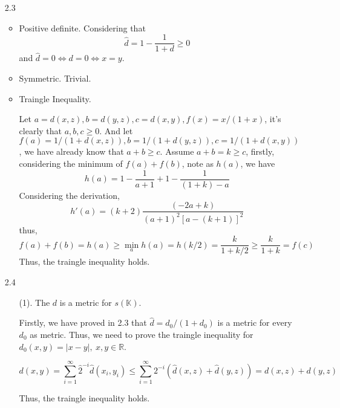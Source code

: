 \documentclass{article}
\begin{document}
\begin{enumerate}
\begin{enumerate}
    \end{enumerate}


\item[2.3]
    \begin{itemize}
        \item Positive definite.
        Considering that
        \[\hat d = 1 - \frac{1}{1 + d} \ge 0\]
        and \(\hat d = 0 \iff d = 0 \iff x = y\).

        \item Symmetric. Trivial.
        \item Traingle Inequality.
        
        Let \(a = d(x, z), b = d(y, z), c = d(x, y), f(x) = x/(1 + x)\), it's clearly that \(a, b, c \ge 0\). And let \(f(a) = 1/(1 + d(x, z)), b = 1/(1 + d(y, z)), c = 1/(1 + d(x, y))\), we have already know that \(a + b \ge c\). Assume \(a + b = k \ge c\), firstly, considering the minimum of \(f(a) + f(b)\), note as \(h(a)\), we have
        \[h(a) = 1 - \frac{1}{a + 1} + 1 - \frac{1}{(1 + k) - a}\]
        Considering the derivation,
        \[h'(a) = (k + 2)\frac{(-2a + k)}{{(a + 1)}^2{[a - (k + 1)]}^2}\]
        thus, 
        \[f(a) + f(b) = h(a) \ge \min_a h(a) = h(k/2) = \frac{k}{1 + k/2} \ge \frac{k}{1 + k} = f(c)\]
        Thus, the traingle inequality holds.
    \end{itemize}


\item[2.4]
    \begin{enumerate}
        \item[(1).] The \(d\) is a metric for \(s(\mathbb K)\).
        
        Firstly, we have proved in 2.3 that \(\hat d = d_0/(1 + d_0)\) is a metric for every \(d_0\) as metric. Thus, we need to prove the traingle inequality for \(d_0(x, y) = |x - y|,\ x, y \in \mathbb{R}\).

        \[d(x, y) = \sum_{i = 1}^{\infty} \hat 2^{-i} \hat d(x_i, y_i) \le \sum_{i = 1}^{\infty} 2^{-i} {(\hat d(x, z) + \hat d(y, z))} = d(x, z) + d(y, z)\]

        Thus, the traingle inequality holds.


\end{enumerate}
\end{enumerate}
\end{document}
